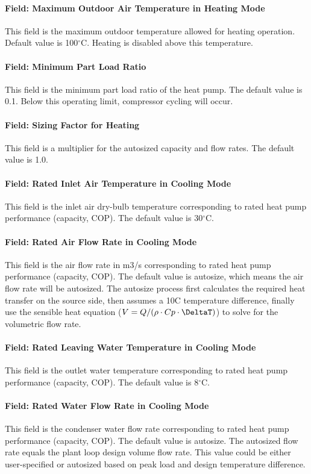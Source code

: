 \paragraph{Field: Maximum Outdoor Air Temperature in Heating Mode} This field is
the maximum outdoor temperature allowed for heating operation. Default value is
100$^\circ$C. Heating is disabled above this temperature.
\paragraph{Field: Minimum Part Load Ratio} This field is the minimum part load
ratio of the heat pump. The default value is 0.1. Below this operating limit,
compressor cycling will occur.
\paragraph{Field: Sizing Factor for Heating} This field is a multiplier for the
autosized capacity and flow rates. The default value is 1.0.
\paragraph{Field: Rated Inlet Air Temperature in Cooling Mode} This field is the
inlet air dry-bulb temperature corresponding to rated heat pump performance
(capacity, COP). The default value is 30$^\circ$C.
\paragraph{Field: Rated Air Flow Rate in Cooling Mode} This field is the air
flow rate in m3/s corresponding to rated heat pump performance (capacity, COP).
The default value is autosize, which means the air flow rate will be autosized.
The autosize process first calculates the required heat transfer on the source
side, then assumes a 10C temperature difference, finally use the sensible heat
equation ($V = Q / (\rho \cdot Cp \cdot \DeltaT)$) to solve for the volumetric flow rate.
\paragraph{Field: Rated Leaving Water Temperature in Cooling Mode} This field is
the outlet water temperature corresponding to rated heat pump performance
(capacity, COP). The default value is 8$^\circ$C.
\paragraph{Field: Rated Water Flow Rate in Cooling Mode} This field is the
condenser water flow rate corresponding to rated heat pump performance
(capacity, COP). The default value is autosize.
The autosized flow rate equals the plant loop design volume flow rate. 
This value could be either user-specified or autosized based on peak load and design
temperature difference.
